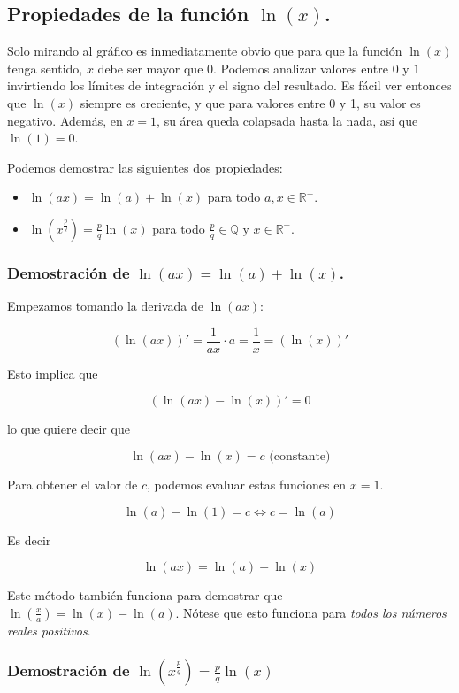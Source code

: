 \newpage

\subsection{Propiedades de la función $\ln(x)$.}

Solo mirando al gráfico es inmediatamente obvio que para que la función $\ln(x)$ tenga sentido, $x$ debe ser mayor que $0$. Podemos analizar valores entre $0$ y $1$ invirtiendo los límites de integración y el signo del resultado. Es fácil ver entonces que $\ln(x)$ siempre es creciente, y que para valores entre 0 y 1, su valor es negativo. Además, en $x = 1$, su área queda colapsada hasta la nada, así que $\ln(1) = 0$.

Podemos demostrar las siguientes dos propiedades:

\begin{itemize}
	\item $\ln(ax) = \ln(a) + \ln(x)$ para todo $a, x \in \mathbb{R}^+$.
	\item $\ln(x^{\frac{p}{q}}) = \frac{p}{q} \ln(x)$ para todo $\frac{p}{q} \in \mathbb{Q}$ y $x \in \mathbb{R}^+$.
\end{itemize}

\subsubsection{Demostración de $\ln(ax) = \ln(a) + \ln(x)$.}

Empezamos tomando la derivada de $\ln(ax)$:

$$(\ln(ax))' = \frac{1}{ax} \cdot a = \frac{1}{x} = (\ln(x))'$$

Esto implica que

$$(\ln(ax) - \ln(x))' = 0$$

lo que quiere decir que

$$\ln(ax) - \ln(x) = c \textrm{ (constante)}$$

Para obtener el valor de $c$, podemos evaluar estas funciones en $x = 1$.

$$\ln(a) - \ln(1) = c \iff c = \ln(a)$$

Es decir

$$\ln(ax) = \ln(a) + \ln(x)$$

Este método también funciona para demostrar que $\ln(\frac{x}{a}) = \ln(x) - \ln(a)$. Nótese que esto funciona para \textit{todos los números reales positivos}.

\subsubsection{Demostración de $\ln(x^{\frac{p}{q}}) = \frac{p}{q} \ln(x)$}

